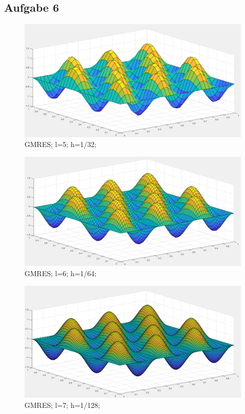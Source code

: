\documentclass{report}
\begin{document}
\subsection{Aufgabe 6}
\begin{figure}
	\includegraphics[width=\linewidth]{Aufgaben-Ressourcen/A6L5M3N2.png} 
		\caption{GMRES; l=5; h=1/32;}
		\label{A6L5}
\end{figure}
\begin{figure}
	\includegraphics[width=\linewidth]{Aufgaben-Ressourcen/A6L6M3N2.png} 
		\caption{GMRES; l=6; h=1/64;}
		\label{A6L6}
\end{figure}
\begin{figure}
	\includegraphics[width=\linewidth]{Aufgaben-Ressourcen/A6L7M3N2.png}
		\caption{GMRES; l=7; h=1/128;}
		\label{A6L7}
\end{figure}
\end{document}
